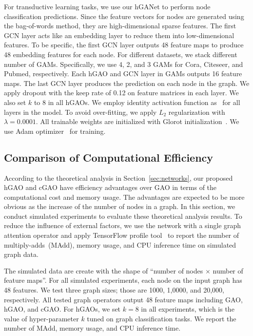 \documentclass[sigconf]{acmart}
\begin{document}
For transductive learning tasks, we use our hGANet to perform node
classification predictions. Since the feature vectors for nodes are generated using the
bag-of-words method, they are high-dimensional sparse features. The first GCN
layer acts like an embedding layer to reduce them into low-dimensional
features. To be specific, the first GCN layer outputs 48 feature maps to
produce 48 embedding features for each node. For different datasets, we stack
different number of GAMs. Specifically, we use 4, 2, and 3 GAMs for Cora,
Citeseer, and Pubmed, respectively. Each hGAO and GCN layer in GAMs outputs
16 feature maps. The last GCN layer produces the prediction on each node in
the graph. We apply dropout with the keep rate of 0.12 on feature matrices in
each layer. We also set $k$ to 8 in all hGAOs. We employ identity
activation function as~\cite{gao2018large} for all layers in the model. To
avoid over-fitting, we apply $L_2$ regularization with $\lambda=0.0001$. All
trainable weights are initialized with Glorot
initialization~\cite{glorot2010understanding}. We use Adam
optimizer~\cite{kingma2014adam} for training.

\subsection{Comparison of Computational Efficiency}

According to the theoretical analysis in Section~\ref{sec:networks}, our
proposed hGAO and cGAO have efficiency advantages over GAO in terms of the
computational cost and memory usage. The advantages are expected to be more
obvious as the increase of the number of nodes in a graph. In this section, we
conduct simulated experiments to evaluate these theoretical analysis results.
To reduce the influence of external factors, we use the network with a single
graph attention operator and apply TensorFlow profile
tool~\cite{abadi2016tensorflow} to report the number of multiply-adds~(MAdd),
memory usage, and CPU inference time on simulated graph data.

The simulated data are create with the shape of ``number of nodes $\times$
number of feature maps''. For all simulated experiments, each node on the
input graph has 48 features. We test three graph sizes; those are 1000,
1,0000, and 20,000, respectively. All tested graph operators output 48 feature
maps including GAO, hGAO, and cGAO. For hGAOs, we set $k=8$ in all
experiments, which is the value of hyper-parameter $k$ tuned on graph
classification tasks. We report the number of MAdd, memory usage, and CPU
inference time.
\end{document}

